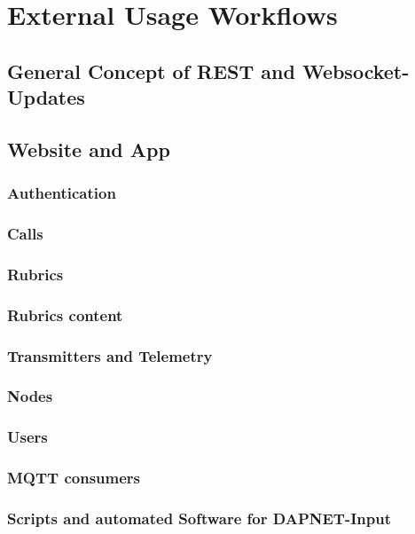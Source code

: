 \chapter{External Usage Workflows}

\section{General Concept of REST and Websocket-Updates}

\section{Website and App}

\subsection{Authentication}

\subsection{Calls}

\subsection{Rubrics}

\subsection{Rubrics content}

\subsection{Transmitters and Telemetry}

\subsection{Nodes}

\subsection{Users}

\subsection{MQTT consumers}

\subsection{Scripts and automated Software for DAPNET-Input}
